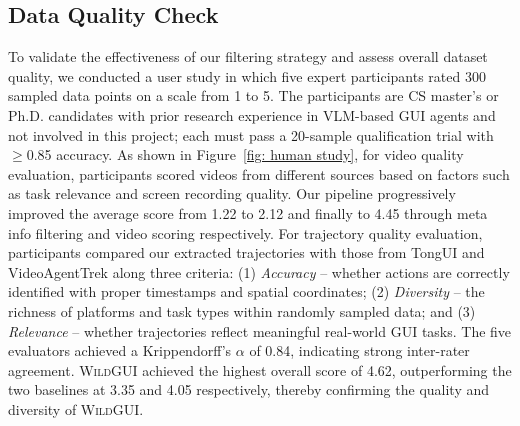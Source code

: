 \documentclass{llmxive}
\providecommand{\ourdataset}{\textsc{WildGUI}\xspace}
\begin{document}

\subsection{Data Quality Check}
To validate the effectiveness of our filtering strategy and assess overall dataset quality, we conducted a user study in which five expert participants rated 300 sampled data points on a scale from 1 to 5. The participants are CS master's or Ph.D. candidates with prior research experience in VLM-based GUI agents and not involved in this project; each must pass a 20-sample qualification trial with $\geq$0.85 accuracy. 
As shown in Figure~\ref{fig: human study}, for video quality evaluation, participants scored videos from different sources based on factors such as task relevance and screen recording quality. Our pipeline progressively improved the average score from 1.22 to 2.12 and finally to 4.45 through meta info filtering and video scoring respectively. 
For trajectory quality evaluation, participants compared our extracted trajectories with those from TongUI and VideoAgentTrek along three criteria: (1) \textit{Accuracy} -- whether actions are correctly identified with proper timestamps and spatial coordinates; (2) \textit{Diversity} -- the richness of platforms and task types within randomly sampled data; and (3) \textit{Relevance} -- whether trajectories reflect meaningful real-world GUI tasks. The five evaluators achieved a Krippendorff's $\alpha$ of 0.84, indicating strong inter-rater agreement. \ourdataset{} achieved the highest overall score of 4.62, outperforming the two baselines at 3.35 and 4.05 respectively, thereby confirming the quality and diversity of \ourdataset{}.
\end{document}
